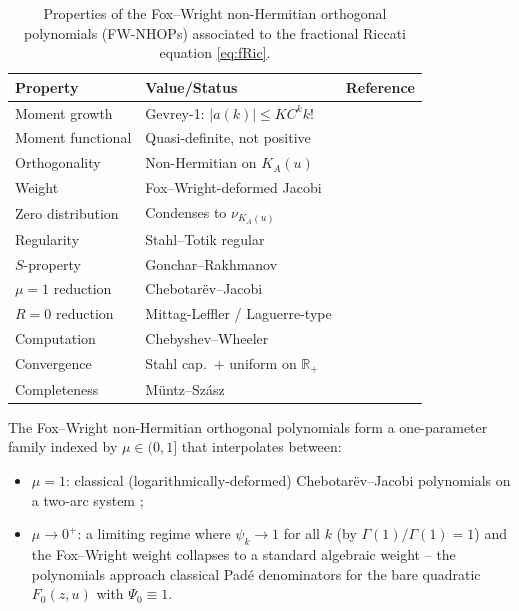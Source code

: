 \documentclass{article}
\newcommand{\R}{\mathbb{R}}
\begin{document}
\begin{table}[h]
\centering
\renewcommand{\arraystretch}{1.4}
\begin{tabular}{lll}
\hline
\textbf{Property} & \textbf{Value/Status} & \textbf{Reference} \\
\hline
Moment growth & Gevrey-1: $|a(k)| \le K C^k k!$ & \cite{Crowley2026} \\
Moment functional & Quasi-definite, not positive & \cite{Crowley2026} \\
Orthogonality & Non-Hermitian on $K_A(u)$ & \cite{NuttallSingh1977} \\
Weight & Fox--Wright-deformed Jacobi & \cite{Wright1935,Crowley2026} \\
Zero distribution & Condenses to $\nu_{K_A(u)}$ & \cite{Stahl1997,Crowley2026} \\
Regularity & Stahl--Totik regular & \cite{StahlTotik1992} \\
$S$-property & Gonchar--Rakhmanov & \cite{GoncharRakhmanov1987} \\
$\mu=1$ reduction & Chebotarëv--Jacobi & \cite{BarhoumiYattselev2023} \\
$R=0$ reduction & Mittag-Leffler / Laguerre-type & \cite{Grothaus2015} \\
Computation & Chebyshev--Wheeler & \cite{Wheeler1974,Gautschi1982} \\
Convergence & Stahl cap.\ + uniform on $\R_+$ & \cite{Stahl1997,Crowley2026} \\
Completeness & Müntz--Szász & \cite{Moragues2018} \\
\hline
\end{tabular}
\caption{Properties of the Fox--Wright non-Hermitian orthogonal polynomials
  (FW-NHOPs) associated to the fractional Riccati equation \eqref{eq:fRic}.}
\end{table}

The Fox--Wright non-Hermitian orthogonal polynomials form a one-parameter
family indexed by $\mu \in (0,1]$ that interpolates between:
\begin{itemize}
  \item $\mu = 1$: classical (logarithmically-deformed) Chebotarëv--Jacobi
    polynomials on a two-arc system \cite{BarhoumiYattselev2023};
  \item $\mu \to 0^+$: a limiting regime where $\psi_k \to 1$ for all $k$
    (by $\Gamma(1)/\Gamma(1) = 1$) and the Fox--Wright weight collapses to
    a standard algebraic weight -- the polynomials approach classical
    Padé denominators for the bare quadratic $F_0(z,u)$ with $\Psi_0 \equiv 1$.
\end{itemize}
\end{document}
